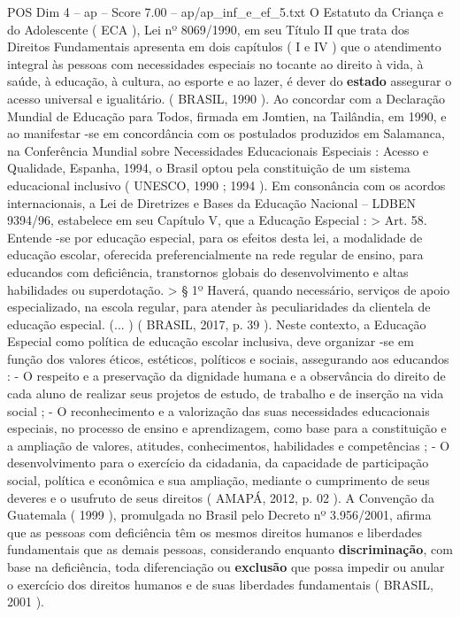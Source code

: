 \begin{textsample}{POS Dim 4 – ap – Score 7.00 – ap/ap\_inf\_e\_ef\_5.txt}
O Estatuto da Criança e do Adolescente ( ECA ), Lei nº 8069/1990, em seu Título II que trata dos Direitos Fundamentais apresenta em dois capítulos ( I e IV ) que o atendimento integral às pessoas com necessidades especiais no tocante ao direito à vida, à saúde, à educação, à cultura, ao esporte e ao lazer, é dever do \textbf{estado} assegurar o acesso universal e igualitário. ( BRASIL, 1990 ).
Ao concordar com a Declaração Mundial de Educação para Todos, firmada em Jomtien, na Tailândia, em 1990, e ao manifestar -se em concordância com os postulados produzidos em Salamanca, na Conferência Mundial sobre Necessidades Educacionais Especiais : Acesso e Qualidade, Espanha, 1994, o Brasil optou pela constituição de um sistema educacional inclusivo ( UNESCO, 1990 ; 1994 ).
Em consonância com os acordos internacionais, a Lei de Diretrizes e Bases da Educação Nacional – LDBEN 9394/96, estabelece em seu Capítulo V, que a Educação Especial : > Art. 58.
Entende -se por educação especial, para os efeitos desta lei, a modalidade de educação escolar, oferecida preferencialmente na rede regular de ensino, para educandos com deficiência, transtornos globais do desenvolvimento e altas habilidades ou superdotação. > § 1º Haverá, quando necessário, serviços de apoio especializado, na escola regular, para atender às peculiaridades da clientela de educação especial. (... ) ( BRASIL, 2017, p. 39 ).
Neste contexto, a Educação Especial como política de educação escolar inclusiva, deve organizar -se em função dos valores éticos, estéticos, políticos e sociais, assegurando aos educandos : - O respeito e a preservação da dignidade humana e a observância do direito de cada aluno de realizar seus projetos de estudo, de trabalho e de inserção na vida social ; - O reconhecimento e a valorização das suas necessidades educacionais especiais, no processo de ensino e aprendizagem, como base para a constituição e a ampliação de valores, atitudes, conhecimentos, habilidades e competências ; - O desenvolvimento para o exercício da cidadania, da capacidade de participação social, política e econômica e sua ampliação, mediante o cumprimento de seus deveres e o usufruto de seus direitos ( AMAPÁ, 2012, p. 02 ).
A Convenção da Guatemala ( 1999 ), promulgada no Brasil pelo Decreto nº 3.956/2001, afirma que as pessoas com deficiência têm os mesmos direitos humanos e liberdades fundamentais que as demais pessoas, considerando enquanto \textbf{discriminação}, com base na deficiência, toda diferenciação ou \textbf{exclusão} que possa impedir ou anular o exercício dos direitos humanos e de suas liberdades fundamentais ( BRASIL, 2001 ).

\end{textsample}

